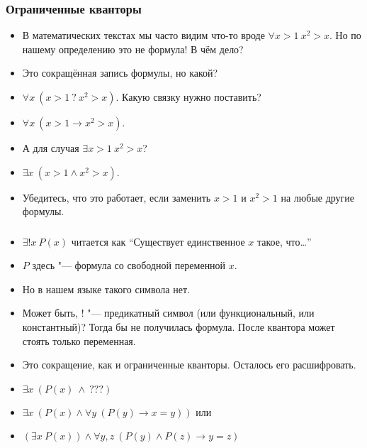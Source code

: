 \documentclass[10pt]{beamer}
\begin{document}
\begin{frame}
   \frametitle{Ограниченные кванторы}
   \begin{itemize}
       \item В математических текстах мы часто видим что-то вроде $\forall x > 1 ~ x^2 > x$. Но по нашему определению это не формула! В чём дело? \pause
       \item Это сокращённая запись формулы, но какой?
       \item $\forall x ~ (x > 1 ~ ? ~ x^2 > x)$. Какую связку нужно поставить?
       \pause
       \item $\forall x ~ (x > 1 \to x^2 > x)$. 
       \pause
       \item А для случая $\exists x > 1 ~ x^2 > x$?
       \pause
       \item $\exists x ~ (x > 1 \land x^2 > x)$.
       \pause
       \item Убедитесь, что это работает, если заменить $x > 1$ и $x^2 > 1$ на любые другие \pause формулы.
   \end{itemize}
\end{frame}

\begin{frame}
   \frametitle{}
   \begin{itemize}
       \item $\exists ! x ~ P(x)$ читается как \pause \enquote{Существует единственное $x$ такое, что\ldots}
       \item $P$ здесь "--- формула со свободной переменной $x$. \pause
       \item Но в нашем языке такого символа нет.
       \item Может быть, $!$ "--- предикатный символ (или функциональный, или константный)? \pause Тогда бы не получилась формула. После квантора может стоять только переменная. \pause
       \item Это сокращение, как и ограниченные кванторы. Осталось его расшифровать. \pause
       \item $\exists x ~ (P(x) ~\land~ ???)$ \pause
       \item $\exists x ~ (P(x) \land \forall y ~ (P(y) \to x = y))$ или 
       \item $(\exists x ~ P(x)) \land \forall y,z ~ (P(y) \land P(z) \to y = z)$
   \end{itemize}
\end{frame}
\end{document}
